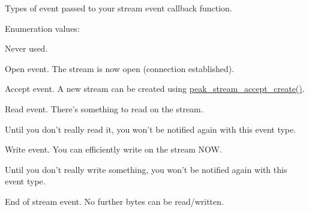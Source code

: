 Types of event passed to your stream event callback function. 

\begin{Desc}
\item[Enumeration values: ]\par
\begin{description}
\item[{\em 
\hypertarget{group__stream_gga3a10}{
PEAK\_\-STREAM\_\-EVT\_\-NONE}
\label{group__stream_gga3a10}
}]Never used. \item[{\em 
\hypertarget{group__stream_gga3a11}{
PEAK\_\-STREAM\_\-EVT\_\-OPEN}
\label{group__stream_gga3a11}
}]Open event. The stream is now open (connection established). \item[{\em 
\hypertarget{group__stream_gga3a12}{
PEAK\_\-STREAM\_\-EVT\_\-ACCEPT}
\label{group__stream_gga3a12}
}]Accept event. A new stream can be created using \hyperlink{group__stream__common_ga32}{peak\_\-stream\_\-accept\_\-create()}. \item[{\em 
\hypertarget{group__stream_gga3a13}{
PEAK\_\-STREAM\_\-EVT\_\-READ}
\label{group__stream_gga3a13}
}]Read event. There's something to read on the stream. 

Until you don't really read it, you won't be notified again with this event type. \item[{\em 
\hypertarget{group__stream_gga3a14}{
PEAK\_\-STREAM\_\-EVT\_\-WRITE}
\label{group__stream_gga3a14}
}]Write event. You can efficiently write on the stream NOW. 

Until you don't really write something, you won't be notified again with this event type. \item[{\em 
\hypertarget{group__stream_gga3a15}{
PEAK\_\-STREAM\_\-EVT\_\-END}
\label{group__stream_gga3a15}
}]End of stream event. No further bytes can be read/written. 


\end{description}
\end{Desc}
